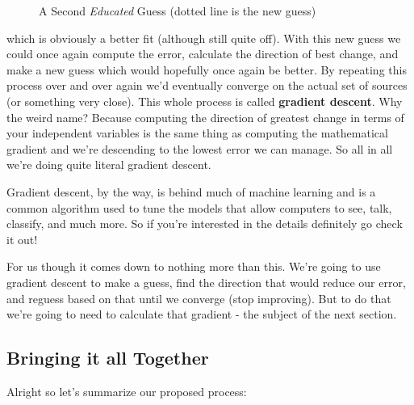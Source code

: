 \documentclass[10pt,a4paper]{article}
\begin{document}
\begin{figure}[!htb]
\caption{\label{fig:my-label} A Second \textit{Educated} Guess (dotted line is the new guess)}
\end{figure}

which is obviously a better fit (although still quite off). With this new guess we could once again compute the error, calculate the direction of best change, and make a new guess which would hopefully once again be better. By repeating this process over and over again we'd eventually converge on the actual set of sources (or something very close). This whole process is called \textbf{gradient descent}. Why the weird name? Because computing the direction of greatest change in terms of your independent variables is the same thing as computing the mathematical gradient and we're descending to the lowest error we can manage. So all in all we're doing quite literal gradient descent. 

Gradient descent, by the way, is behind much of machine learning and is a common algorithm used to tune the models that allow computers to see, talk, classify, and much more. So if you're interested in the details definitely go check it out!

For us though it comes down to nothing more than this. We're going to use gradient descent to make a guess, find the direction that would reduce our error, and reguess based on that until we converge (stop improving). But to do that we're going to need to calculate that gradient - the subject of the next section.

\subsection{Bringing it all Together}
Alright so let's summarize our proposed process:
\end{document}
